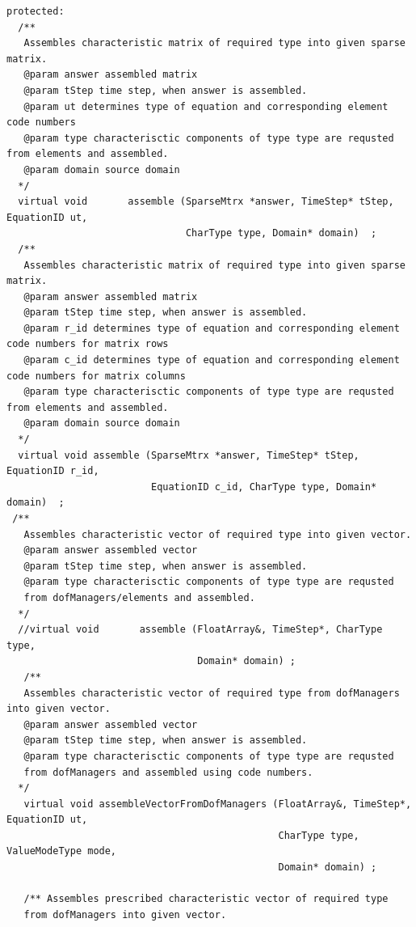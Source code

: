 \documentclass[a4paper]{article}
\begin{document}
{\begin{verbatim}
protected:
  /**
   Assembles characteristic matrix of required type into given sparse matrix.
   @param answer assembled matrix
   @param tStep time step, when answer is assembled.
   @param ut determines type of equation and corresponding element code numbers
   @param type characterisctic components of type type are requsted from elements and assembled.
   @param domain source domain
  */
  virtual void       assemble (SparseMtrx *answer, TimeStep* tStep, EquationID ut, 
                               CharType type, Domain* domain)  ;
  /**
   Assembles characteristic matrix of required type into given sparse matrix.
   @param answer assembled matrix
   @param tStep time step, when answer is assembled.
   @param r_id determines type of equation and corresponding element code numbers for matrix rows
   @param c_id determines type of equation and corresponding element code numbers for matrix columns
   @param type characterisctic components of type type are requsted from elements and assembled.
   @param domain source domain
  */
  virtual void assemble (SparseMtrx *answer, TimeStep* tStep, EquationID r_id, 
                         EquationID c_id, CharType type, Domain* domain)  ;
 /**
   Assembles characteristic vector of required type into given vector.
   @param answer assembled vector
   @param tStep time step, when answer is assembled.
   @param type characterisctic components of type type are requsted 
   from dofManagers/elements and assembled.
  */
  //virtual void       assemble (FloatArray&, TimeStep*, CharType type, 
                                 Domain* domain) ;
   /**
   Assembles characteristic vector of required type from dofManagers into given vector.
   @param answer assembled vector
   @param tStep time step, when answer is assembled.
   @param type characterisctic components of type type are requsted 
   from dofManagers and assembled using code numbers.
  */
   virtual void assembleVectorFromDofManagers (FloatArray&, TimeStep*, EquationID ut, 
                                               CharType type, ValueModeType mode, 
                                               Domain* domain) ;

   /** Assembles prescribed characteristic vector of required type
   from dofManagers into given vector.


\end{verbatim}}
\end{document}
